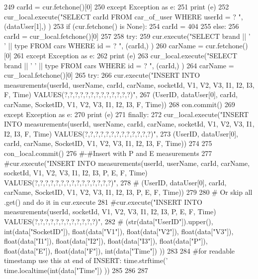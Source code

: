 \begin{DoxyCode}
249             carId = cur.fetchone()[0]        
250     \textcolor{keywordflow}{except} Exception \textcolor{keyword}{as} e:
251         \textcolor{keywordflow}{print} (e)
252         cur\_local.execute(\textcolor{stringliteral}{"SELECT carId FROM car\_of\_user WHERE userId = ? "}, (dataUser[1],) )
253         \textcolor{keywordflow}{if} (cur.fetchone() \textcolor{keywordflow}{is} \textcolor{keywordtype}{None}):
254             carId = 404
255         \textcolor{keywordflow}{else}:
256             carId = cur\_local.fetchone()[0]
257     
258     \textcolor{keywordflow}{try}:
259         cur.execute(\textcolor{stringliteral}{"SELECT brand || ' ' || type FROM cars WHERE id = ? "}, (carId,) )
260         carName = cur.fetchone()[0]
261     \textcolor{keywordflow}{except} Exception \textcolor{keyword}{as} e:
262         \textcolor{keywordflow}{print} (e)
263         cur\_local.execute(\textcolor{stringliteral}{"SELECT brand || ' ' || type FROM cars WHERE id = ? "}, (carId,) )
264         carName = cur\_local.fetchone()[0]
265     \textcolor{keywordflow}{try}:    
266         cur.execute(\textcolor{stringliteral}{"INSERT INTO measurements(userId, userName, carId, carName, socketId, V1, V2, V3, I1,
       I2, I3, F, Time) VALUES(?,?,?,?,?,?,?,?,?,?,?,?,?)"},
267                     (UserID, dataUser[0], carId, carName, SocketID, V1, V2, V3, I1, I2, I3, F, Time))
268         con.commit()
269     \textcolor{keywordflow}{except} Exception \textcolor{keyword}{as} e:
270         \textcolor{keywordflow}{print} (e)
271     \textcolor{keywordflow}{finally}:
272         cur\_local.execute(\textcolor{stringliteral}{"INSERT INTO measurements(userId, userName, carId, carName, socketId, V1, V2, V3,
       I1, I2, I3, F, Time) VALUES(?,?,?,?,?,?,?,?,?,?,?,?,?)"},
273                 (UserID, dataUser[0], carId, carName, SocketID, V1, V2, V3, I1, I2, I3, F, Time))
274     
275     con\_local.commit()
276     \textcolor{comment}{#-#Insert with P and E measurements}
277     \textcolor{comment}{#cur.execute("INSERT INTO measurements(userId, userName, carId, carName, socketId, V1, V2, V3, I1, I2,
       I3, P, E, F, Time) VALUES(?,?,?,?,?,?,?,?,?,?,?,?,?,?,?)",}
278     \textcolor{comment}{#            (UserID, dataUser[0], carId, carName, SocketID, V1, V2, V3, I1, I2, I3, P, E, F, Time))}
279     
280     \textcolor{comment}{# Or skip all .get() and do it in cur.execute     }
281     \textcolor{comment}{#cur.execute("INSERT INTO measurements(userId, socketId, V1, V2, V3, I1, I2, I3, P, E, F, Time)
       VALUES(?,?,?,?,?,?,?,?,?,?,?,?)",}
282     \textcolor{comment}{#            (str(data["UserID"]).upper(), int(data["SocketID"]), float(data["V1"]), float(data["V2"]),
       float(data["V3"]), float(data["I1"]), float(data["I2"]), float(data["I3"]), float(data["P"]),
       float(data["E"]), float(data["F"]), int(data["Time"]) ))}
283     
284    \textcolor{comment}{#for readable timestamp use this at end of INSERT: time.strftime('%
       time.localtime(int(data["Time"]) ))}
285     
286     
287 
\end{DoxyCode}
